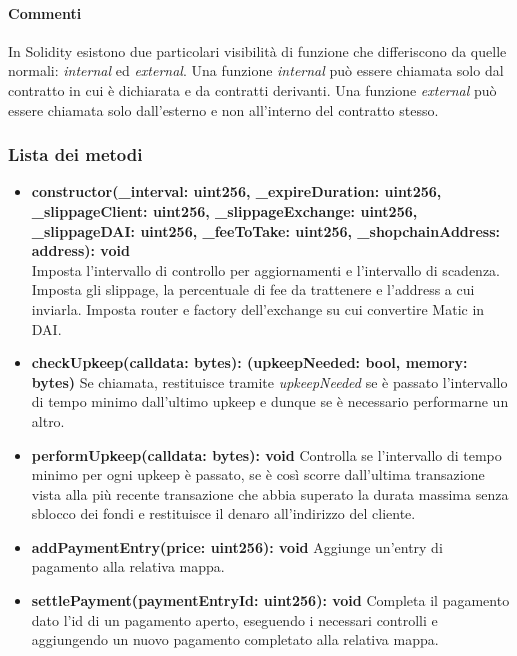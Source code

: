 \documentclass[a4paper, 12pt]{article}
\begin{document}
\paragraph{Commenti}
In Solidity esistono due particolari visibilità di funzione che differiscono da quelle normali: \textit{internal} ed \textit{external}.
Una funzione \textit{internal} può essere chiamata solo dal contratto in cui è dichiarata e da contratti derivanti.
Una funzione \textit{external} può essere chiamata solo dall'esterno e non all'interno del contratto stesso.
\subsubsection{Lista dei metodi}
\begin{itemize}
    \item \textbf{constructor(\_interval: uint256, \_expireDuration: uint256, \_slippageClient: uint256, \_slippageExchange: uint256, \_slippageDAI: uint256, \_feeToTake: uint256, \_shopchainAddress: address): void}
    \\Imposta l'intervallo di controllo per aggiornamenti e l'intervallo di scadenza.
    Imposta gli slippage, la percentuale di fee da trattenere e l'address a cui inviarla.
    Imposta router e factory dell'exchange su cui convertire Matic in DAI.\\
    \item \textbf{checkUpkeep(calldata: bytes): (upkeepNeeded: bool, memory: bytes)}
    Se chiamata, restituisce tramite \textit{upkeepNeeded} se è passato l'intervallo di tempo minimo dall'ultimo upkeep e dunque se è necessario performarne un altro.\\
    \item \textbf{performUpkeep(calldata: bytes): void}
    Controlla se l'intervallo di tempo minimo per ogni upkeep è passato, se è così scorre dall'ultima transazione vista alla più recente transazione che abbia superato la durata massima senza sblocco dei fondi
    e restituisce il denaro all'indirizzo del cliente.\\
    \item \textbf{addPaymentEntry(price: uint256): void}
    Aggiunge un'entry di pagamento alla relativa mappa.\\
    \item \textbf{settlePayment(paymentEntryId: uint256): void}
    Completa il pagamento dato l'id di un pagamento aperto, eseguendo i necessari controlli e aggiungendo un nuovo pagamento completato alla relativa mappa.\\

\end{itemize}
\end{document}
